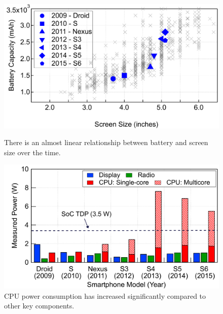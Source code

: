 \begin{figure}[t]
\centering
  \begin{minipage}[b]{0.47\columnwidth}
    \centering
    \includegraphics[trim=0 0 0 0, clip, width=\columnwidth]{figs/screen_batt}
    \caption{\small{There is an almost linear relationship between battery and screen size over the time.}}
  \label{fig:screen_batt}
  \end{minipage}
  \hspace*{15pt}
  \begin{minipage}[b]{0.47\columnwidth}
    \centering
    \includegraphics[trim=0 0 0 0, clip, width=\columnwidth]{figs/phone_power_trend}
    \caption{\small{CPU power consumption has increased significantly compared to other key components.}}
  \label{fig:phone_power_trend}
  \end{minipage}
\end{figure}

